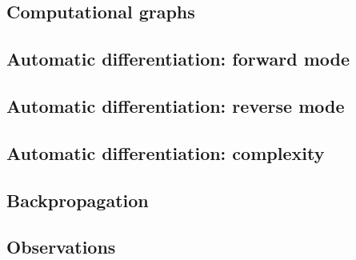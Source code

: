 \subsection{Computational graphs} 


\subsection{Automatic differentiation: forward mode} 


\subsection{Automatic differentiation: reverse mode} 


\subsection{Automatic differentiation: complexity} 


\subsection{Backpropagation} 


\subsection{Observations} 

